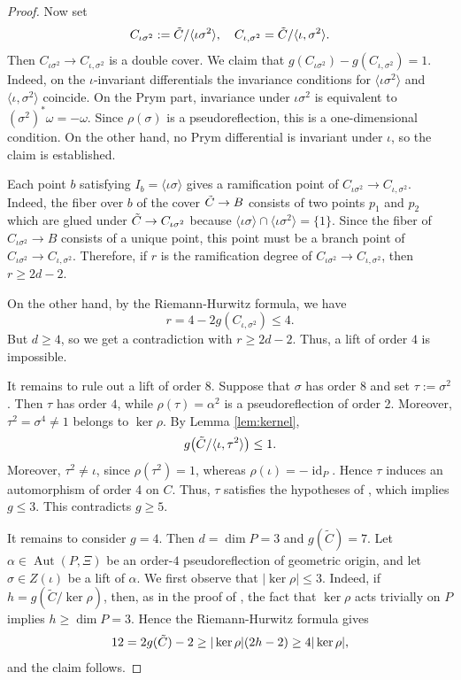 \documentclass{article}
\numberwithin{equation}{section}
\newcommand{\tC}{\Tilde{C}}
\newcommand{\s}{\sigma}
\DeclareMathOperator{\Aut}{Aut}
\DeclareMathOperator{\id}{id}
\begin{document}
\begin{proof}
Now set
$$ C_{\iota\sigma^2}:=\tC/\langle\iota\sigma^2\rangle, \ \ \ C_{\iota,\sigma^2}=\tC/\langle\iota,\sigma^2\rangle.$$
Then $C_{\iota\sigma^2}\to C_{\iota,\sigma^2}$ is a double cover. We claim that $g(C_{\iota\sigma^2})-g(C_{\iota,\s^2})=1.$ Indeed, on the $\iota$-invariant differentials the invariance conditions for $\langle\iota\sigma^2\rangle$ and $\langle\iota,\sigma^2\rangle$ coincide. On the Prym part, invariance under $\iota\sigma^2$ is equivalent to $(\sigma^2)^*\omega=-\omega$. Since $\rho(\sigma)$ is a pseudoreflection, this is a one-dimensional condition. On the other hand, no Prym differential is invariant under $\iota$, so the claim is established.

Each point $b$ satisfying $I_b = \langle \iota\s \rangle$ gives a ramification point of $C_{\iota\sigma^2}\to C_{\iota, \sigma^2}$. Indeed, the fiber over $b$ of the cover $\tC \to B$ consists of two points $p_1$ and $p_2$ which are glued under $\tC \to C_{\iota\s^2}$ because $\langle \iota\s \rangle \cap \langle \iota\s^2\rangle = \{1\}$. Since the fiber of $C_{\iota\s^2} \to B$ consists of a unique point, this point must be a branch point of $C_{\iota\s^2} \to C_{\iota,\s^2}$.
Therefore, if $r$ is the ramification degree of $C_{\iota\s^2}\to C_{\iota,\s^2}$, then $r \geq 2d-2$.

On the other hand, by the Riemann-Hurwitz formula, we have $$r=4-2g(C_{\iota, \s^2})\leq4.$$
But $d\geq4$, so we get a contradiction with $r \geq 2d-2$. Thus, a lift of order $4$ is impossible.

It remains to rule out a lift of order $8$. Suppose that $\sigma$ has order $8$ and set $\tau:=\sigma^2$. Then $\tau$ has order $4$, while $\rho(\tau)=\alpha^2$
is a pseudoreflection of order 2. Moreover, $\tau^2=\sigma^4\neq1$
belongs to $\ker\rho$. By Lemma \ref{lem:kernel},
$$g\bigl(\tC/\langle\iota,\tau^2\rangle\bigr)\leq1.$$ Moreover, $\tau^2\neq\iota$, since
$\rho(\tau^2)=1$, whereas $\rho(\iota)=-\id_P$. Hence $\tau$ induces an automorphism of order 4 on $C$. Thus, $\tau$ satisfies the hypotheses of \cite[Lemma 3.5]{ALN}, which implies $g\leq3$. This contradicts $g\geq5$.

It remains to consider \(g=4\). Then
$d=\dim P=3$ and $g(\widetilde C)=7.$  Let
$\alpha\in\Aut(P,\Xi)$ be an order-$4$ pseudoreflection of geometric origin, and let $\sigma\in Z(\iota)$ be a lift of $\alpha$. We first observe that $ |\ker\rho|\leq3.$ Indeed, if $h=g(\widetilde C/\ker\rho)$, then, as in the proof of
\cite[Lemma 3.1]{ALN}, the fact that $\ker\rho$ acts trivially on $P$
implies $h\geq\dim P=3$. Hence the  Riemann-Hurwitz formula gives
$$
12=2g(\tC)-2\geq |\ker\rho|(2h-2)\geq4|\ker\rho|,$$ and the claim follows.


\end{proof}
\end{document}
